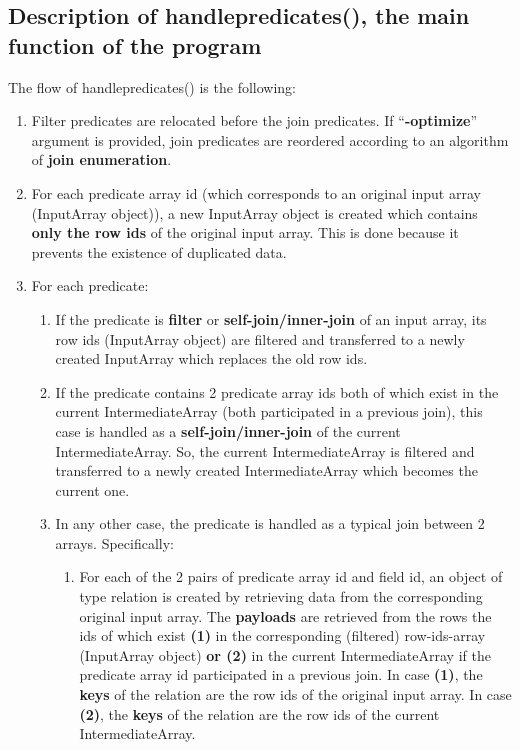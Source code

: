 \documentclass{ws-ijprai}
\begin{document}
\subsection{Description of handlepredicates(), the main function of the program}
The flow of handlepredicates() is the following:
\begin{enumerate}
    \item Filter predicates are relocated before the join predicates. If “\textbf{-optimize}” argument is provided, join predicates are reordered according to an algorithm of \textbf{join enumeration}.
    \item For each predicate array id (which corresponds to an original input array (InputArray object)), a new InputArray object is created which contains \textbf{only the row ids} of the original input array. This is done because it prevents the existence of duplicated data.
    \item For each predicate:
    \begin{enumerate}
        \item If the predicate is \textbf{filter} or \textbf{self-join/inner-join} of an input array, its row ids (InputArray object) are filtered and transferred to a newly created InputArray which replaces the old row ids.
        \item If the predicate contains 2 predicate array ids both of which exist in the current IntermediateArray (both participated in a previous join), this case is handled as a \textbf{self-join/inner-join} of the current IntermediateArray. So, the current IntermediateArray is filtered and transferred to a newly created IntermediateArray which becomes the current one.
        \item In any other case, the predicate is handled as a typical join between 2 arrays. Specifically:
        \begin{enumerate}
            \item For each of the 2 pairs of predicate array id and field id, an object of type relation is created by retrieving data from the corresponding original input array. The \textbf{payloads} are retrieved from the rows the ids of which exist \textbf{(1)} in the corresponding (filtered) row-ids-array (InputArray object) \textbf{or (2)} in the current IntermediateArray if the predicate array id participated in a previous join. In case \textbf{(1)}, the \textbf{keys} of the relation are the row ids of the original input array. In case \textbf{(2)}, the \textbf{keys} of the relation are the row ids of the current IntermediateArray.

\end{enumerate}
\end{enumerate}
\end{enumerate}
\end{document}
